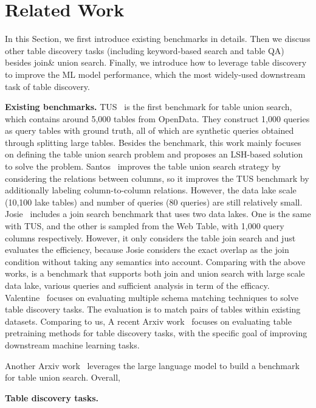 \section{Related Work}
In this Section, we first introduce existing  benchmarks in details. Then we discuss other table discovery tasks  (including keyword-based search and table QA) besides join\& union search. Finally, we introduce how to leverage table discovery to improve the ML model performance, which the most widely-used downstream task of table discovery. 



\noindent \textbf{Existing benchmarks.} 
TUS~\cite{TUS} is the first benchmark for table union search, which contains around 5,000 tables from OpenData. They construct 1,000 queries  as query tables with ground truth, all of which are synthetic queries obtained through splitting large tables. Besides the benchmark, this work mainly focuses on defining the table union search problem and proposes an LSH-based  solution to solve the problem.
%
Santos~\cite{Santos} improves the table union search strategy by considering the relations between columns, so it improves the  TUS benchmark by additionally labeling column-to-column relations. However, the data lake scale (10,100  lake tables) and number of queries (80 queries) are still relatively small. 
%
Josie~\cite{Josie} includes a join search benchmark that uses two data lakes. One is the same with TUS, and the other is sampled from the Web Table, with 1,000 query columns respectively. However, it only considers the table join search and just evaluates the efficiency, because Josie  considers the exact overlap as the join condition without taking any semantics into account. 
%
Comparing with the above works, \sys is a benchmark that supports both join and union search with large scale data lake, various queries and sufficient analysis in term of the efficacy.
%
Valentine~\cite{valentine} focuses on evaluating multiple schema matching techniques to solve table discovery tasks. The evaluation is to match pairs of tables within  existing datasets. Comparing to us,    
%
A recent Arxiv work~\cite{arxiv} focuses on evaluating table pretraining methods for table
 discovery tasks, with the specific goal of improving downstream machine learning tasks. 
 
%
Another Arxiv work~\cite{arxiv} leverages the large language model to build a benchmark for table union search.
%
Overall, \sys

\noindent \textbf{Table discovery tasks.}

